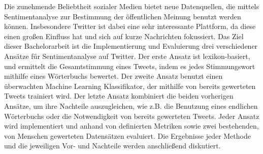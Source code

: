 Die zunehmende Beliebtheit sozialer Medien bietet neue Datenquellen, die mittels Sentimentanalyse zur Bestimmung der öffentlichen Meinung benutzt werden können. Insbesondere Twitter ist dabei eine sehr interessante Plattform, da diese einen großen Einfluss hat und sich auf kurze Nachrichten fokussiert. Das Ziel dieser Bachelorarbeit ist die Implementierung und Evaluierung drei verschiedener Ansätze für Sentimentanalyse auf Twitter. Der erste Ansatz ist lexikon-basiert, und ermittelt die Gesamtstimmung eines Tweets, indem es jedes Stimmungswort mithilfe eines Wörterbuchs bewertet. Der zweite Ansatz benutzt einen überwachten Machine Learning Klassifikator, der mithilfe von bereits gewerteten Tweets trainiert wird. Der letzte Ansatz kombiniert die beiden vorherigen Ansätze, um ihre Nachteile auszugleichen, wie z.B. die Benutzung eines endlichen Wörterbuchs oder die Notwendigkeit von bereits gewerteten Tweets. Jeder Ansatz wird implementiert und anhand von definierten Metriken sowie zwei bestehenden, von Menschen gewerteten Datensätzen evaluiert. Die Ergebnisse jeder Methode und die jeweiligen Vor- und Nachteile werden anschließend diskutiert.












